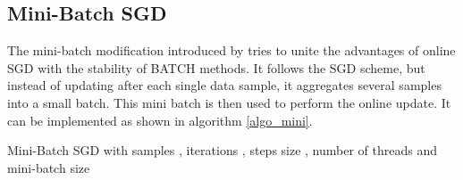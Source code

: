\documentclass{acm_proc_article-sp}
\begin{document}
\subsection{Mini-Batch SGD}\label{sec_minisgd}
The mini-batch modification introduced by \cite{sculley2010web}
tries to unite the advantages of online SGD with the stability of BATCH
methods. It follows the SGD scheme, but instead of updating after each single
data sample, it aggregates several samples into a small batch. This mini
batch is then used to perform the online update.   
It can be implemented as shown in algorithm \ref{algo_mini}.
\begin{algorithm}
\caption{Mini-Batch SGD 
with samples , iterations , steps size
, number of threads  and mini-batch size }
\label{algo_mini}
\begin{algorithmic}[1]
\Require{}
\ForAll{ }
\ForAll{ }
\EndFor
{}

\EndFor
\State{\Return }

\end{algorithmic}
\end{algorithm}
\end{document}
